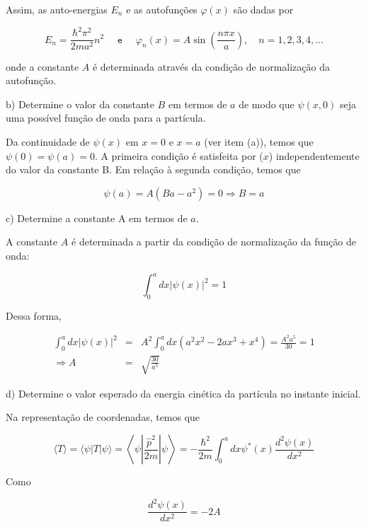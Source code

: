 \begin{enumerate}[start=1,label={\bfseries Q\arabic*.}]
{Assim, as auto-energias $E_{n}$ e as autofunções $\varphi(x)$ são dadas por

$$
E_{n} = \frac{\hbar^{2} \pi^{2}}{2 m a^{2}} n^{2} \quad \texttt{ e } \quad \varphi_{n}(x) = A \sin \left(\frac{n \pi x}{a}\right), \quad n=1,2,3,4, \ldots
$$

onde a constante $A$ é determinada através da condição de normalização da autofunção.


}



b) Determine o valor da constante $B$ em termos de $a$ de modo que $\psi(x,0)$ seja uma possível função de onda para a partícula.

{\color{red}

Da continuidade de $\psi(x)$ em $x = 0$ e $x = a$ (ver item (a)), temos que $\psi(0) = \psi(a) = 0$. A primeira condição é satisfeita por ($x$) independentemente do valor da constante B. Em relação à segunda condição, temos que

$$
\psi(a)=A\left(B a-a^{2}\right)=0 \Rightarrow B=a
$$


}

c) Determine a constante A em termos de $a$.

{\color{red}

A constante $A$ é determinada a partir da condição de normalização da função de onda:

$$
\int_{0}^{a} d x|\psi(x)|^{2}=1
$$

Dessa forma,

\begin{eqnarray}
  \int_{0}^{a} d x|\psi(x)|^{2} &=& A^{2} \int_{0}^{a} d x \left(a^{2} x^{2}-2 a x^{3}+x^{4}\right) = \frac{A^{2} a^{5}}{30} = 1 \\
  \Rightarrow A &=& \sqrt{\frac{30}{a^{5}}}
\end{eqnarray}


}

d) Determine o valor esperado da energia cinética da partícula no instante inicial.

{\color{red}

Na representação de coordenadas, temos que

$$
\langle T\rangle=\langle\psi|T| \psi\rangle=\left\langle\psi\left|\frac{\hat{p}^{2}}{2 m}\right| \psi\right\rangle=-\frac{\hbar^{2}}{2 m} \int_{0}^{a} d x \psi^{*}(x) \frac{d^{2} \psi(x)}{d x^{2}}
$$

Como

$$
\frac{d^{2} \psi(x)}{d x^{2}}=-2 A
$$


}
\end{enumerate}
